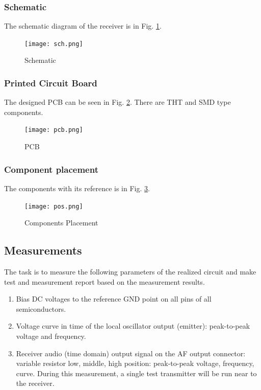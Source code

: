 \documentclass[
11pt, %
a4paper, %
oneside, %
headinclude,footinclude, %
BCOR5mm, %
]{scrartcl}
\begin{document}
\newpage
\subsubsection{Schematic}

The schematic diagram of the receiver is in Fig. \ref{fig:schematic}.

\begin{figure}[h!]
\centering
\texttt{[image: sch.png]}\\
\caption{Schematic}
\label{fig:schematic}
\end{figure}

\newpage
\subsubsection{Printed Circuit Board}

The designed PCB can be seen in Fig. \ref{fig:pcb}. There are THT and SMD type components.

\begin{figure}[h!]
\centering
\texttt{[image: pcb.png]}
\caption{PCB}
\label{fig:pcb}
\end{figure}

\subsubsection{Component placement}

The components with its reference is in Fig. \ref{fig:components}.

\begin{figure}[h!]
\centering
\texttt{[image: pos.png]}
\caption{Components Placement}
\label{fig:components}
\end{figure}

\newpage
\subsection{Measurements}
The task is to measure the following parameters of the realized circuit and make test and measurement report based on the measurement results.

\begin{enumerate}
\item Bias DC voltages to the reference GND point on all pins of all semiconductors.
\item Voltage curve in time of the local oscillator output (emitter): peak-to-peak voltage and frequency.
\item Receiver audio (time domain) output signal on the AF output connector: 
variable resistor low, middle, high position: 
peak-to-peak voltage, frequency, curve. During this measurement, 
a single test transmitter will be run near to the receiver.
\end{enumerate}
\end{document}
